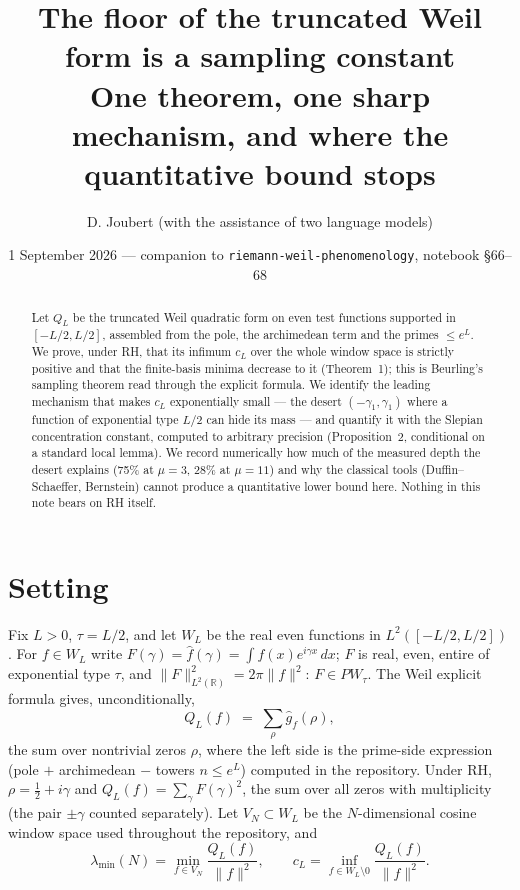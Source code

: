 \documentclass[11pt]{article}
\title{The floor of the truncated Weil form is a sampling constant\\ \large One theorem, one sharp mechanism, and where the quantitative bound stops}
\author{D. Joubert (with the assistance of two language models)}
\date{1 September 2026 --- companion to \texttt{riemann-weil-phenomenology}, notebook \S66--68}
\theoremstyle{remark}\newtheorem*{remark}{Remark}
\begin{document}
\maketitle
\begin{abstract}
Let $Q_L$ be the truncated Weil quadratic form on even test functions supported in $[-L/2,L/2]$, assembled from the pole, the archimedean term and the primes $\le e^L$. We prove, under RH, that its infimum $c_L$ over the whole window space is strictly positive and that the finite-basis minima decrease to it (Theorem~1); this is Beurling's sampling theorem read through the explicit formula. We identify the leading mechanism that makes $c_L$ exponentially small --- the desert $(-\gamma_1,\gamma_1)$ where a function of exponential type $L/2$ can hide its mass --- and quantify it with the Slepian concentration constant, computed to arbitrary precision (Proposition~2, conditional on a standard local lemma). We record numerically how much of the measured depth the desert explains (75\% at $\mu=3$, 28\% at $\mu=11$) and why the classical tools (Duffin--Schaeffer, Bernstein) cannot produce a quantitative lower bound here. Nothing in this note bears on RH itself.
\end{abstract}

\section{Setting}
Fix $L>0$, $\tau=L/2$, and let $W_L$ be the real even functions in $L^2([-L/2,L/2])$. For $f\in W_L$ write $F(\gamma)=\hat f(\gamma)=\int f(x)e^{i\gamma x}\,dx$; $F$ is real, even, entire of exponential type $\tau$, and $\|F\|_{L^2(\mathbb R)}^2=2\pi\|f\|^2$: $F\in PW_\tau$. The Weil explicit formula gives, unconditionally,
\[
Q_L(f)\;=\;\sum_{\rho}\hat g_f(\rho),
\]
the sum over nontrivial zeros $\rho$, where the left side is the prime-side expression (pole $+$ archimedean $-$ towers $n\le e^L$) computed in the repository. Under RH, $\rho=\tfrac12+i\gamma$ and $Q_L(f)=\sum_{\gamma}F(\gamma)^2$, the sum over all zeros with multiplicity (the pair $\pm\gamma$ counted separately). Let $V_N\subset W_L$ be the $N$-dimensional cosine window space used throughout the repository, and
\[
\lambda_{\min}(N)=\min_{f\in V_N}\frac{Q_L(f)}{\|f\|^2},\qquad c_L=\inf_{f\in W_L\setminus 0}\frac{Q_L(f)}{\|f\|^2}.
\]
\end{document}
